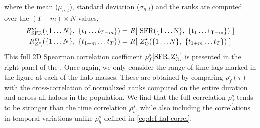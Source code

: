 where the mean ($\mu_{n,t}$), standard deviation ($\sigma_{n,t}$) and the ranks are computed over the $(T-m) \times N$ values,
\begin{align}
R^m_{\rm{SFR}}(\{1 \ldots N\}, ~\{t_1 \ldots t_{T-m}\}) &= R[ ~\rm{SFR}(\{1 \ldots N\}, ~\{t_1 \ldots t_{T-m}\}) ~]\\
R^m_{Z^{\star}_{\rm{O}}}(\{1 \ldots N\}, ~\{t_{1+m} \ldots t_T\}) &= R[ ~Z^{\star}_{\rm{O}}(\{1 \ldots N\}, ~\{t_{1+m} \ldots t_T\}) ~]
\end{align}
This full 2D Spearman correlation coefficient $\rho^s_f[\rm{SFR},Z^{\star}_{\rm{O}}]$ is presented in the right panel of the .
Once again, we only consider the range of time-lags marked in the figure at each of the halo masses. These are obtained by comparing $\rho^s_f(\tau)$ with the cross-correlation of normalized ranks computed on the entire duration and across all haloes in the population. We find that the full correlation $\rho^s_f$ tends to be stronger than the time correlation $\rho^s_t$, while also including the correlations in temporal variations unlike $\rho^s_h$ defined in \eqref{eq:def-hal-correl}.


